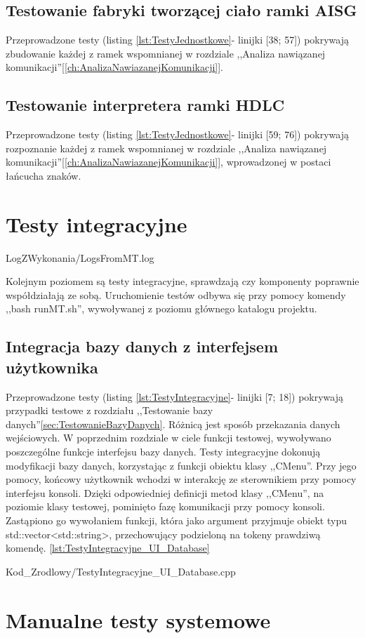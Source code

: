     \subsection{Testowanie fabryki tworzącej ciało ramki AISG}
        Przeprowadzone testy (listing \ref{lst:TestyJednostkowe}- linijki [38; 57]) pokrywają zbudowanie każdej z ramek
        wspomnianej w rozdziale ,,Analiza nawiązanej komunikacji''[\ref{ch:AnalizaNawiazanejKomunikacji}].
    \subsection{Testowanie interpretera ramki HDLC}
        Przeprowadzone testy (listing \ref{lst:TestyJednostkowe}- linijki [59; 76]) pokrywają rozpoznanie każdej z ramek 
        wspomnianej w rozdziale ,,Analiza nawiązanej komunikacji''[\ref{ch:AnalizaNawiazanejKomunikacji}], wprowadzonej w postaci łańcucha znaków.


\section{Testy integracyjne}
    
    {LogZWykonania/LogsFromMT.log}
    
    Kolejnym poziomem są testy integracyjne, sprawdzają czy komponenty poprawnie współdziałają ze sobą. \cite{Testowanie}
    Uruchomienie testów odbywa się przy pomocy komendy ,,bash runMT.sh'', wywoływanej z poziomu głównego katalogu projektu.
    
    \subsection{Integracja bazy danych z interfejsem użytkownika}
    Przeprowadzone testy (listing \ref{lst:TestyIntegracyjne}- linijki [7; 18]) pokrywają przypadki testowe z rozdziału ,,Testowanie bazy danych''\ref{sec:TestowanieBazyDanych}.
    Różnicą jest sposób przekazania danych wejściowych. W poprzednim rozdziale w ciele funkcji testowej, wywoływano poszczególne funkcje interfejsu bazy danych.
    Testy integracyjne dokonują modyfikacji bazy danych, korzystając z funkcji obiektu klasy ,,CMenu''. Przy jego pomocy, końcowy użytkownik wchodzi w interakcję ze sterownikiem  
    przy pomocy interfejsu konsoli. Dzięki odpowiedniej definicji metod klasy ,,CMenu'', na poziomie klasy testowej, pominięto fazę komunikacji przy pomocy konsoli.
    Zastąpiono go wywołaniem funkcji, która jako argument przyjmuje obiekt typu std::vector<std::string>, przechowujący podzieloną na tokeny prawdziwą komendę.
    \ref{lst:TestyIntegracyjne_UI_Database}
    
        {Kod_Zrodlowy/TestyIntegracyjne_UI_Database.cpp}

\section{Manualne testy systemowe}

